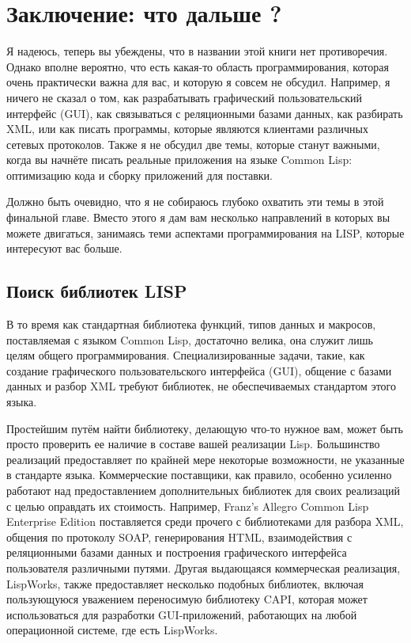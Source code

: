 \chapter{Заключение: что дальше ?}
\label{ch:32}

Я надеюсь, теперь вы убеждены, что в названии этой книги нет противоречия.  Однако вполне
вероятно, что есть какая-то область программирования, которая очень практически важна для
вас, и которую я совсем не обсудил. Например, я ничего не сказал о том, как разрабатывать
графический пользовательский интерфейс (GUI), как связываться с реляционными базами
данных, как разбирать XML, или как писать программы, которые являются клиентами различных
сетевых протоколов. Также я не обсудил две темы, которые станут важными, когда вы начнёте
писать реальные приложения на языке Common Lisp: оптимизацию кода и сборку приложений для
поставки.

Должно быть очевидно, что я не собираюсь глубоко охватить эти темы в этой финальной
главе. Вместо этого я дам вам несколько направлений в которых вы можете двигаться,
занимаясь теми аспектами программирования на LISP, которые интересуют вас больше.

\section{Поиск библиотек LISP}

В то время как стандартная библиотека функций, типов данных и макросов, поставляемая с
языком Common Lisp, достаточно велика, она служит лишь целям общего
программирования. Специализированные задачи, такие, как создание графического
пользовательского интерфейса (GUI), общение с базами данных и разбор XML требуют
библиотек, не обеспечиваемых стандартом этого языка.

Простейшим путём найти библиотеку, делающую что-то нужное вам, может быть просто проверить
ее наличие в составе вашей реализации Lisp. Большинство реализаций предоставляет по
крайней мере некоторые возможности, не указанные в стандарте языка. Коммерческие
поставщики, как правило, особенно усиленно работают над предоставлением дополнительных
библиотек для своих реализаций с целью оправдать их стоимость. Например, Franz's Allegro
Common Lisp Enterprise Edition поставляется среди прочего с библиотеками для разбора XML,
общения по протоколу SOAP, генерирования HTML, взаимодействия с реляционными базами данных
и построения графического интерфейса пользователя различными путями.  Другая выдающаяся
коммерческая реализация, LispWorks, также предоставляет несколько подобных библиотек,
включая пользующуюся уважением переносимую библиотеку CAPI, которая может использоваться
для разработки GUI-приложений, работающих на любой операционной системе, где есть
LispWorks.

